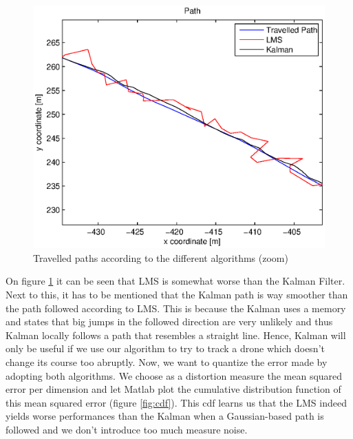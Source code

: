 \documentclass[a4paper]{article}        %
\begin{document}
			\begin{figure}[H]
				\centering
				\includegraphics[width=\textwidth]{images/tracking_algorithms_zoom.eps}
				\caption{Travelled paths according to the different algorithms (zoom)}
				\label{fig:paths_zoom}
			\end{figure}

On figure \ref{fig:paths_zoom} it can be seen that LMS is somewhat worse than the Kalman Filter. Next to this, it has to be mentioned that the Kalman path is way smoother than the path followed according to LMS. This is because the Kalman uses a memory and states that big jumps in the followed direction are very unlikely and thus Kalman locally follows a path that resembles a straight line. Hence, Kalman will only be useful if we use our algorithm to try to track a drone which doesn't change its course too abruptly.
Now, we want to quantize the error made by adopting both algorithms. We choose as a distortion measure the mean squared error per dimension and let Matlab plot the cumulative distribution function of this mean squared error (figure \ref{fig:cdf}). This cdf learns us that the LMS indeed yields worse performances than the Kalman when a Gaussian-based path is followed and we don't introduce too much measure noise.
			
\end{document}
